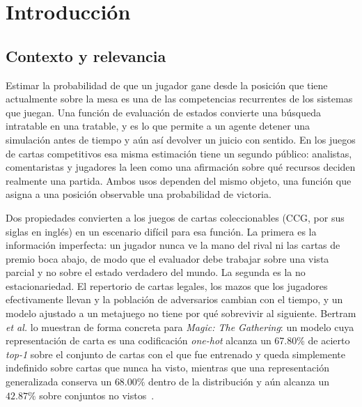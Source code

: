\documentclass[conference]{IEEEtran}
\begin{document}
\section{Introducci\'on}
\label{sec:introduction}

\subsection{Contexto y relevancia}
\label{subsec:context}

Estimar la probabilidad de que un jugador gane desde la posici\'on que
tiene actualmente sobre la mesa es una de las competencias recurrentes de
los sistemas que juegan. Una funci\'on de evaluaci\'on de estados convierte
una b\'usqueda intratable en una tratable, y es lo que permite a un agente
detener una simulaci\'on antes de tiempo y a\'un as\'i devolver un juicio
con sentido. En los juegos de cartas competitivos esa misma estimaci\'on
tiene un segundo p\'ublico: analistas, comentaristas y jugadores la leen
como una afirmaci\'on sobre qu\'e recursos deciden realmente una partida.
Ambos usos dependen del mismo objeto, una funci\'on que asigna a una
posici\'on observable una probabilidad de victoria.

Dos propiedades convierten a los juegos de cartas coleccionables (CCG, por
sus siglas en ingl\'es) en un escenario dif\'icil para esa funci\'on. La
primera es la informaci\'on imperfecta: un jugador nunca ve la mano del
rival ni las cartas de premio boca abajo, de modo que el evaluador debe
trabajar sobre una vista parcial y no sobre el estado verdadero del mundo.
La segunda es la no estacionariedad. El repertorio de cartas legales, los
mazos que los jugadores efectivamente llevan y la poblaci\'on de
adversarios cambian con el tiempo, y un modelo ajustado a un metajuego no
tiene por qu\'e sobrevivir al siguiente. Bertram \textit{et al.} lo
muestran de forma concreta para \emph{Magic: The Gathering}: un modelo
cuya representaci\'on de carta es una codificaci\'on \emph{one-hot}
alcanza un 67.80\% de acierto \emph{top-1} sobre el conjunto de cartas
con el que fue entrenado y queda simplemente indefinido sobre cartas que
nunca ha visto, mientras que una representaci\'on generalizada conserva un
$68.00\%$ dentro de la distribuci\'on y a\'un alcanza un $42.87\%$
sobre conjuntos no vistos~\cite{bertram_cardrepresentations_2024}.
\end{document}
